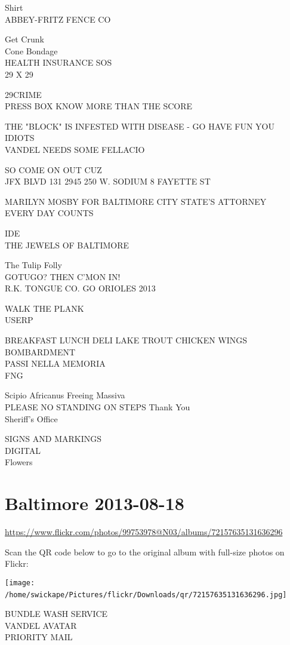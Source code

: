 \documentclass[10pt,letterpaper]{article}
\begin{document}
Shirt\\
ABBEY{-}FRITZ FENCE CO

Get Crunk\\
Cone Bondage\\
HEALTH INSURANCE SOS\\
29 X 29

29CRIME\\
PRESS BOX KNOW MORE THAN THE SCORE

THE "BLOCK" IS INFESTED WITH DISEASE {-} GO HAVE FUN YOU IDIOTS\\
VANDEL NEEDS SOME FELLACIO

SO COME ON OUT CUZ\\
JFX BLVD 131 2945 250 W. SODIUM 8 FAYETTE ST

MARILYN MOSBY FOR BALTIMORE CITY STATE'S ATTORNEY\\
EVERY DAY COUNTS

IDE\\
THE JEWELS OF BALTIMORE

The Tulip Folly\\
GOTUGO? THEN C'MON IN!\\
R.K. TONGUE CO. GO ORIOLES 2013

WALK THE PLANK\\
USERP

BREAKFAST LUNCH DELI LAKE TROUT CHICKEN WINGS\\
BOMBARDMENT\\
PASSI NELLA MEMORIA\\
FNG

Scipio Africanus Freeing Massiva\\
PLEASE NO STANDING ON STEPS Thank You\\
Sheriff's Office

SIGNS AND MARKINGS\\
DIGITAL\\
Flowers
\

\section*{Baltimore 2013-08-18}

\url{https://www.flickr.com/photos/99753978@N03/albums/72157635131636296}

Scan the QR code below to go to the original album with full-size photos on Flickr:

\texttt{[image: /home/swickape/Pictures/flickr/Downloads/qr/72157635131636296.jpg]}
\

BUNDLE WASH SERVICE\\
VANDEL AVATAR\\
PRIORITY MAIL
\end{document}
